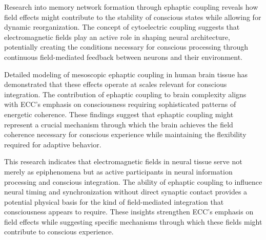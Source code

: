 Research into memory network formation through ephaptic coupling \cite{Pinotsis2023Ephaptic} reveals how field effects might contribute to the stability of conscious states while allowing for dynamic reorganization. The concept of cytoelectric coupling \cite{Pinotsis2023Cytoelectric} suggests that electromagnetic fields play an active role in shaping neural architecture, potentially creating the conditions necessary for conscious processing through continuous field-mediated feedback between neurons and their environment.

Detailed modeling of mesoscopic ephaptic coupling in human brain tissue \cite{Reimann2020Modeling} has demonstrated that these effects operate at scales relevant for conscious integration. The contribution of ephaptic coupling to brain complexity \cite{Cunha2024Ephapticity} aligns with ECC's emphasis on consciousness requiring sophisticated patterns of energetic coherence. These findings suggest that ephaptic coupling might represent a crucial mechanism through which the brain achieves the field coherence necessary for conscious experience while maintaining the flexibility required for adaptive behavior.

This research indicates that electromagnetic fields in neural tissue serve not merely as epiphenomena but as active participants in neural information processing and conscious integration. The ability of ephaptic coupling to influence neural timing and synchronization without direct synaptic contact provides a potential physical basis for the kind of field-mediated integration that consciousness appears to require. These insights strengthen ECC's emphasis on field effects while suggesting specific mechanisms through which these fields might contribute to conscious experience.